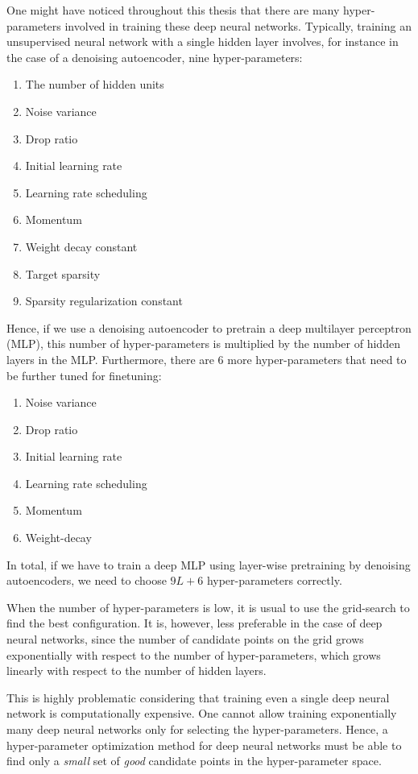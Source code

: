 \documentclass{now}
\begin{document}
One might have noticed throughout this thesis that there are
many hyper-parameters involved in training these deep
neural networks. Typically, training an unsupervised neural
network with a single hidden layer involves, for instance
in the case of a denoising autoencoder, nine
hyper-parameters:
\begin{enumerate}
    \itemsep 0em
    \item The number of hidden units
    \item Noise variance
    \item Drop ratio
    \item Initial learning rate
    \item Learning rate scheduling
    \item Momentum
    \item Weight decay constant
    \item Target sparsity
    \item Sparsity regularization constant
\end{enumerate}
Hence, if we use a denoising autoencoder to pretrain a deep
multilayer perceptron (MLP), this number of 
hyper-parameters is multiplied by the number of hidden layers
in the MLP. Furthermore, there are 6 more hyper-parameters
that need to be further tuned for finetuning: 
\begin{enumerate}
    \itemsep 0em
    \item Noise variance
    \item Drop ratio
    \item Initial learning rate
    \item Learning rate scheduling
    \item Momentum
    \item Weight-decay
\end{enumerate}
In total, if we have to train a deep MLP using layer-wise
pretraining by denoising autoencoders, we need to choose $9L
+ 6$ hyper-parameters correctly. 

When the number of hyper-parameters is low, it is usual to
use the grid-search to find the best configuration. It is, however,
less preferable in the case of deep neural networks, since
the number of candidate points on the grid grows
exponentially with respect to the number of
hyper-parameters,
which grows linearly with respect to the number of hidden
layers. 

This is highly problematic considering that training even a
single deep neural network is computationally expensive. One
cannot allow training exponentially many deep neural
networks only for selecting the hyper-parameters.
Hence, a hyper-parameter optimization method for deep neural
networks must be able to find only a \textit{small} set of
\textit{good} candidate points in the hyper-parameter space.
\end{document}

